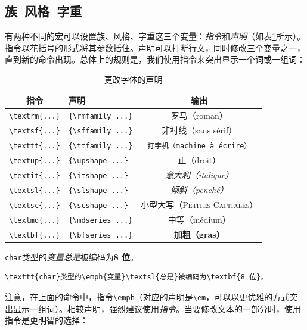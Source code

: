 \subsection{族--风格--字重}

有两种不同的宏可以设置族、风格、字重这三个变量：\emph{指令}和\emph{声明}（如表\ref{tab:2.1}所示）。指令以花括号的形式将其参数括住。声明可以打断行文，同时修改三个变量之一，直到新的命令出现。总体上的规则是，我们使用指令来突出显示一个词或一组词：

\begin{table}
    \centering
    \begin{tabular}{|c|l|c|}
\hline
指令 & 声明 & 输出\\
\hline
\verb+\textrm{...}+ & \verb+{\rmfamily ...}+ & 罗马（roman） \\
\verb+\textsf{...}+ & \verb+{\sffamily ...}+ & \textsf{非衬线（sans sérif）} \\
\verb+\texttt{...}+ & \verb+{\ttfamily ...}+ & \texttt{打字机（machine à écrire）} \\
\hline
\verb+\textup{...}+ & \verb+{\upshape ...}+ & 正（droit） \\
\verb+\textit{...}+ & \verb+{\itshape ...}+ & \textit{意大利（italique）} \\
\verb+\textsl{...}+ & \verb+{\slshape ...}+ & \textsl{倾斜（penché）} \\
\verb+\textsc{...}+ & \verb+{\scshape ...}+ & \textsc{小型大写（Petites Capitales）} \\
\hline
\verb+\textmd{...}+ & \verb+{\mdseries ...}+ & 中等（médium） \\
\verb+\textbf{...}+ & \verb+{\bfseries ...}+ & \textbf{加粗（gras）} \\
\hline
    \end{tabular}
    \caption{更改字体的声明}
    \label{tab:2.1}
\end{table}

\begin{codelist}[2.1]{
    \texttt{char}类型的\emph{变量}\textsl{总是}被编码为\textbf{8 位}。
}
\begin{verbatim}
\texttt{char}类型的\emph{变量}\textsl{总是}被编码为\textbf{8 位}。
\end{verbatim}
\end{codelist}

注意，在上面的命令中，指令\verb|\emph|（对应的声明是\verb|\em|，可以以更优雅的方式突出显示一组词）。相较声明，强烈建议使用\emph{指令}。当要修改文本的一部分时，使用指令是更明智的选择：

